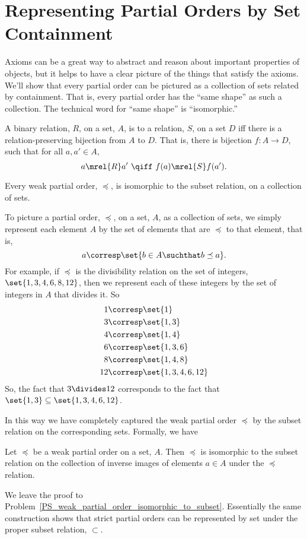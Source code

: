 \section{Representing Partial Orders by Set Containment}

Axioms can be a great way to abstract and reason about important
properties of objects, but it helps to have a clear picture of the things
that satisfy the axioms.  We'll show that every partial order can be
pictured as a collection of sets related by containment.  That is, every
partial order has the ``same shape'' as such a collection.  The technical
word for ``same shape'' is ``isomorphic.''

\begin{definition}\label{relation-isomorphism}
  A binary relation, $R$, on a set, $A$, is
   to a relation, $S$, on a set $D$ iff there is a
  relation-preserving bijection from $A$ to $D$.  That is, there is
  bijection $f:A \to D$, such that for all $a,a' \in A$,
  \[
  a \mrel{R} a'\ \qiff\ f(a) \mrel{S} f(a').
  \]
\end{definition}

\begin{theorem}
  Every weak partial order, $\preceq$, is isomorphic to the subset
  relation, on a collection of sets.
\end{theorem}

To picture a partial order, $\preceq$, on a set, $A$, as a collection of
sets, we simply represent each element $A$ by the set of elements
that are $\preceq$ to that element, that is,
\[
a \corresp \set{b \in A \suchthat b \preceq a}.
\]
For example, if $\preceq$ is the divisibility relation on the set of
integers, $\set{1,3,4,6,8,12}$, then we represent each of these integers
by the set of integers in $A$ that divides it.  So
\begin{align*}
1 & \corresp \set{1}\\
3 & \corresp \set{1,3}\\
4 & \corresp \set{1,4}\\
6 & \corresp \set{1,3,6}\\
8 & \corresp \set{1,4,8}\\
12 & \corresp \set{1,3,4,6, 12}
\end{align*}
So, the fact that $3 \divides 12$ corresponds to the fact that $\set{1,3}
\subseteq \set{1,3,4,6, 12}$.

In this way we have completely captured the weak partial order $\preceq$ by the
subset relation on the corresponding sets.  Formally, we have
\begin{lemma}\label{rgb}
  Let $\preceq$ be a weak partial order on a set, $A$.  Then $\preceq$ is
  isomorphic to the subset relation on the collection of inverse images of
  elements $a \in A$ under the $\preceq$ relation.
\end{lemma}
We leave the proof to
Problem~\ref{PS_weak_partial_order_isomorphic_to_subset}.  Essentially
the same construction shows that strict partial orders can be
represented by set under the proper subset relation, $\subset$.

